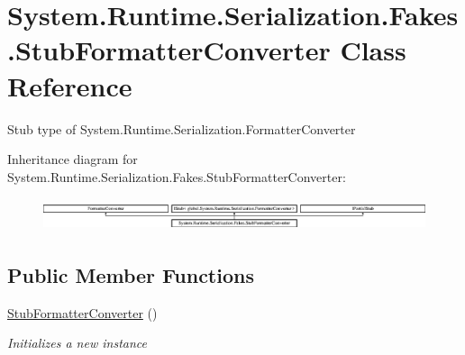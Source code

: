 \hypertarget{class_system_1_1_runtime_1_1_serialization_1_1_fakes_1_1_stub_formatter_converter}{\section{System.\-Runtime.\-Serialization.\-Fakes.\-Stub\-Formatter\-Converter Class Reference}
\label{class_system_1_1_runtime_1_1_serialization_1_1_fakes_1_1_stub_formatter_converter}
}


Stub type of System.\-Runtime.\-Serialization.\-Formatter\-Converter 


Inheritance diagram for System.\-Runtime.\-Serialization.\-Fakes.\-Stub\-Formatter\-Converter\-:\begin{figure}[H]
\begin{center}
\leavevmode
\includegraphics[height=0.967185cm]{class_system_1_1_runtime_1_1_serialization_1_1_fakes_1_1_stub_formatter_converter}
\end{center}
\end{figure}
\subsection*{Public Member Functions}
\begin{DoxyCompactItemize}
\item 
\hyperlink{class_system_1_1_runtime_1_1_serialization_1_1_fakes_1_1_stub_formatter_converter_a408f013cd49ea4739c61f6caf7647205}{Stub\-Formatter\-Converter} ()
\begin{DoxyCompactList}\small\item\em Initializes a new instance\end{DoxyCompactList}\end{DoxyCompactItemize}
